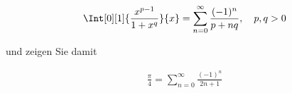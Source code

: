 
\begin{exercise}

\phantom{}

\begin{align*}
    \Int[0][1]
    {
        \frac{x^{p-1}}{1 + x^q}
    }{x}
    =
    \sum_{n=0}^\infty
    \frac{(-1)^n}{p + n q},
    \quad
    p, q > 0
\end{align*}

und zeigen Sie damit

\begin{align*}
    \frac{\pi}{4}
    =
    \sum_{n=0}^\infty
    \frac{(-1)^n}{2 n + 1}
\end{align*}

\end{exercise}


